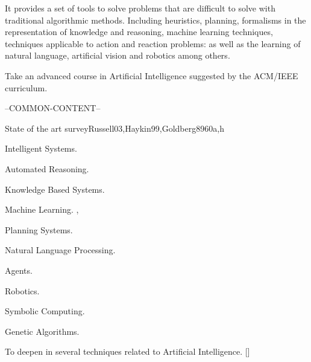 \begin{syllabus}


\begin{justification}
  It provides a set of tools to solve problems that are difficult to solve with traditional algorithmic methods. Including heuristics, planning, formalisms in the representation of knowledge and reasoning, machine learning techniques, techniques applicable to action and reaction problems: as well as the learning of natural language, artificial vision and robotics among others. 
\end{justification}

\begin{goals}
\item Take an advanced course in Artificial Intelligence suggested by the ACM/IEEE curriculum.
\end{goals}

--COMMON-CONTENT--

\begin{unit}{}{State of the art survey}{Russell03,Haykin99,Goldberg89}{60}{a,h}
\begin{topics}
  \item Intelligent Systems.
  \item Automated Reasoning.
  \item Knowledge Based Systems.
  \item Machine Learning. \cite{Russell03},\cite{Haykin99}
  \item Planning Systems.
  \item Natural Language Processing.
  \item Agents.
  \item Robotics.
  \item Symbolic Computing.
  \item Genetic Algorithms. \cite{Goldberg89}
\end{topics}
\begin{learningoutcomes}
  \item To deepen in several techniques related to Artificial Intelligence. [\Usage]
\end{learningoutcomes}
\end{unit}

\begin{coursebibliography}
\end{coursebibliography}

\end{syllabus}
